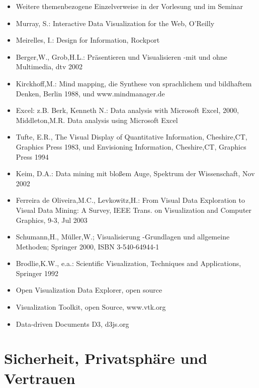 \begin{itemize}
\tightlist
\item
  Weitere themenbezogene Einzelverweise in der Vorlesung und im Seminar
\item
  Murray, S.: Interactive Data Visualization for the Web, O'Reilly
\item
  Meirelles, I.: Design for Information, Rockport
\item
  Berger,W., Grob,H.L.: Präsentieren und Visualisieren -mit und ohne
  Multimedia, dtv 2002
\item
  Kirckhoff,M.: Mind mapping, die Synthese von sprachlichem und
  bildhaftem Denken, Berlin 1988, und www.mindmanager.de
\item
  Excel: z.B. Berk, Kenneth N.: Data analysis with Microsoft Excel,
  2000, Middleton,M.R. Data analysis using Microsoft Excel
\item
  Tufte, E.R., The Visual Display of Quantitative Information,
  Cheshire,CT, Graphics Press 1983, und Envisioning Information,
  Cheshire,CT, Graphics Press 1994
\item
  Keim, D.A.: Data mining mit bloßem Auge, Spektrum der Wissenschaft,
  Nov 2002
\item
  Ferreira de Oliveira,M.C., Levkowitz,H.: From Visual Data Exploration
  to Visual Data Mining: A Survey, IEEE Trans. on Visualization and
  Computer Graphics, 9-3, Jul 2003
\item
  Schumann,H., Müller,W.; Visualisierung -Grundlagen und allgemeine
  Methoden; Springer 2000, ISBN 3-540-64944-1
\item
  Brodlie,K.W., e.a.: Scientific Visualization, Techniques and
  Applications, Springer 1992
\item
  Open Visualization Data Explorer, open source
\item
  Visualization Toolkit, open Source, www.vtk.org
\item
  Data-driven Documents D3, d3js.org
\end{itemize}

\chapter{Sicherheit, Privatsphäre und
Vertrauen}\label{sicherheit-privatsphuxe4re-und-vertrauen}

